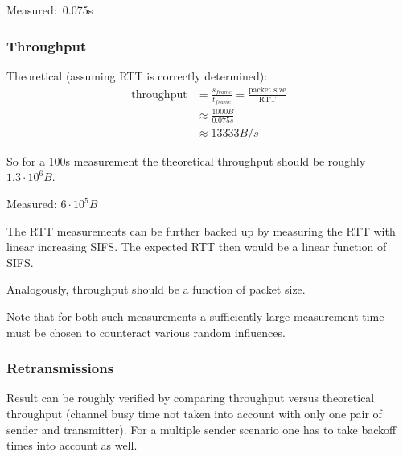 \documentclass{article}
\begin{document}
\bigskip

Measured:~0.075s 

\subsubsection{Throughput}

\bigskip

Theoretical (assuming RTT is correctly determined):
\begin{equation*}
\begin{split}
	\text{throughput} & = \frac{s_{frame}}{t_{frame}} = \frac{\text{packet size}}{\text{RTT}} \\
	& \approx \frac{1000B}{0.075s} \\
	& \approx 13333B/s
\end{split}
\end{equation*}

So for a 100s measurement the theoretical throughput should be roughly $1.3\cdot 10^6 B$.

Measured: $6 \cdot 10^5 B$

\bigskip
The RTT measurements can be further backed up by measuring the RTT with linear increasing SIFS. The expected RTT then would be a linear function of SIFS.

\bigskip

Analogously, throughput should be a function of packet size. 

\bigskip

Note that for both such measurements a sufficiently large measurement time must be chosen to counteract various random influences.

\subsubsection{Retransmissions}
Result can be roughly verified by comparing throughput versus theoretical throughput (channel busy time not taken into account with only one pair of sender and transmitter). For a multiple sender scenario one has to take backoff times into account as well.
\end{document}
